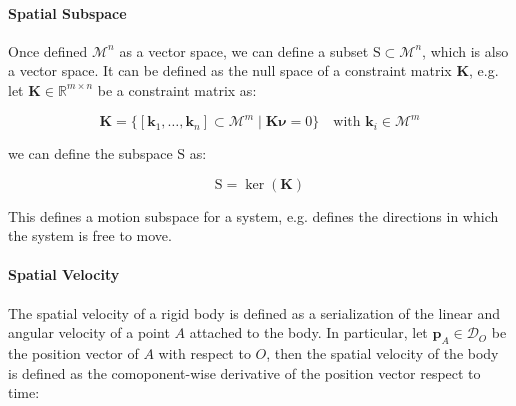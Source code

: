 \begin{figure}
\end{figure}

\paragraph{Spatial Subspace} Once defined $\mathcal{M} ^n$ as a vector space, we can define a subset $\mathrm{S} \subset \mathcal{M} ^n$, which is also a vector space. It can be defined as
the null space of a constraint matrix $\mathbf{K}$, e.g. let $\mathbf{K} \in \mathbb{R} ^{m \times n}$ be a constraint matrix as:

\begin{equation}
    \mathbf{K} = \{ [\mathbf{k} _1, \dots, \mathbf{k} _n]  \subset \mathcal{M} ^m \mid \mathbf{K} \boldsymbol{\nu} = 0 \} \quad \text{with } \mathbf{k} _i \in \mathcal{M} ^m
\end{equation}

we can define the subspace $\mathrm{S}$ as:

\begin{equation}
    \mathrm{S} = \ker (\mathbf{K})
\end{equation}

This defines a motion subspace for a system, e.g. defines the directions in which the system is free to move.

\paragraph{Spatial Velocity} The spatial velocity of a rigid body is defined as a serialization of the linear and angular velocity of a point $A$ attached to the body. In particular, let $\mathbf{p} _A \in \mathcal{D}_O$ be the position vector of $A$ with respect to $O$, then the spatial velocity of the body is defined as the comoponent-wise derivative of the position vector respect to time:

